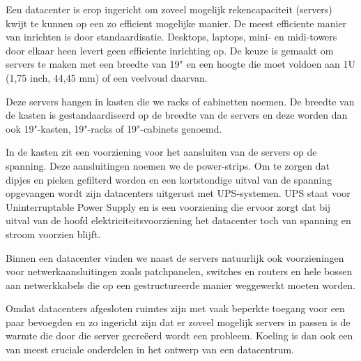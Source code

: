 Een datacenter is erop ingericht om zoveel mogelijk rekencapaciteit (servers) kwijt te kunnen op een zo efficient mogelijke manier. De meest efficiente manier van inrichten is door standaardisatie. Desktops, laptops, mini- en midi-towers door elkaar heen levert geen efficiente inrichting op. De keuze is gemaakt om servers te maken met een breedte van 19" en een hoogte die moet voldoen aan 1U (1,75 inch, 44,45 mm) of een veelvoud daarvan.

Deze servers hangen in kasten die we racks of cabinetten noemen. De breedte van de kasten is gestandaardiseerd op de breedte van de servers en deze worden dan ook 19"-kasten, 19"-racks of 19"-cabinets genoemd.

In de kasten zit een voorziening voor het aansluiten van de servers op de spanning. Deze aansluitingen noemen we de power-strips. Om te zorgen dat dipjes en pieken gefilterd worden en een kortstondige uitval van de spanning opgevangen wordt zijn datacenters uitgerust met UPS-systemen. UPS staat voor Uninterruptable Power Supply en is een voorziening die ervoor zorgt dat bij uitval van de hoofd elektriciteitsvoorziening het datacenter toch van spanning en stroom voorzien blijft.

Binnen een datacenter vinden we naast de servers natuurlijk ook voorzieningen voor netwerkaansluitingen zoals patchpanelen, switches en routers en hele bossen aan netwerkkabels die op een gestructureerde manier weggewerkt moeten worden.

Omdat datacenters afgesloten ruimtes zijn met vaak beperkte toegang voor een paar bevoegden en zo ingericht zijn dat er zoveel mogelijk servers in passen is de warmte die door die server gecre\"eerd wordt een probleem. Koeling is dan ook een van meest cruciale onderdelen in het ontwerp van een datacentrum.
